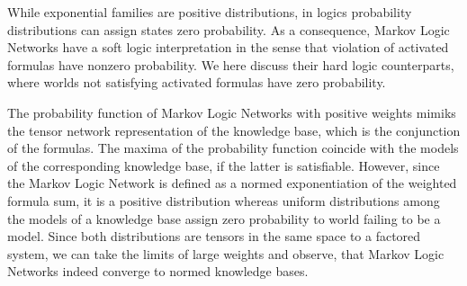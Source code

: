 \label{sec:hardNetworks} %

While exponential families are positive distributions, in logics probability distributions can assign states zero probability.
As a consequence, Markov Logic Networks have a soft logic interpretation in the sense that violation of activated formulas have nonzero probability.
We here discuss their hard logic counterparts, where worlds not satisfying activated formulas have zero probability.

\label{sec:hardLogicLimit} %

The probability function of Markov Logic Networks with positive weights mimiks the tensor network representation of the knowledge base, which is the conjunction of the formulas. 
The maxima of the probability function coincide with the models of the corresponding knowledge base, if the latter is satisfiable.
However, since the Markov Logic Network is defined as a normed exponentiation of the weighted formula sum, it is a positive distribution whereas uniform distributions among the models of a knowledge base assign zero probability to world failing to be a model.
Since both distributions are tensors in the same space to a factored system, we can take the limits of large weights and observe, that Markov Logic Networks indeed converge to normed knowledge bases.


